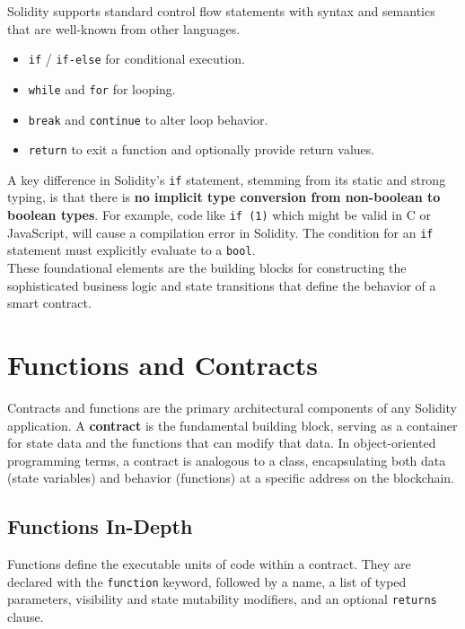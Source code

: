 \documentclass{scrbook}
\begin{document}
Solidity supports standard control flow statements with syntax and semantics that are well-known from other languages.

\begin{itemize}
    \item \texttt{if} / \texttt{if-else} for conditional execution.
    \item \texttt{while} and \texttt{for} for looping.
    \item \texttt{break} and \texttt{continue} to alter loop behavior.
    \item \texttt{return} to exit a function and optionally provide return values.
\end{itemize}

A key difference in Solidity's \texttt{if} statement, stemming from its static and strong typing, is that there is \textbf{no implicit type conversion from non-boolean to boolean types}. For example, code like \texttt{if (1)} which might be valid in C or JavaScript, will cause a compilation error in Solidity. The condition for an \texttt{if} statement must explicitly evaluate to a \texttt{bool}.\\

These foundational elements are the building blocks for constructing the sophisticated business logic and state transitions that define the behavior of a smart contract.

\chapter{Functions and Contracts}

Contracts and functions are the primary architectural components of any Solidity application. A \textbf{contract} is the fundamental building block, serving as a container for state data and the functions that can modify that data. In object-oriented programming terms, a contract is analogous to a class, encapsulating both data (state variables) and behavior (functions) at a specific address on the blockchain.

\section{Functions In-Depth}

Functions define the executable units of code within a contract. They are declared with the \texttt{function} keyword, followed by a name, a list of typed parameters, visibility and state mutability modifiers, and an optional \texttt{returns} clause.
\end{document}
